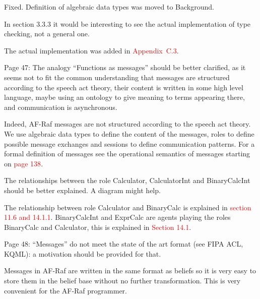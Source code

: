 \documentclass{article}
\newcommand*\R[1]{\textcolor{red}{#1}} %
\newenvironment{them}{\noindent\begingroup\color{blue}}{\endgroup\par}
\begin{document}
Fixed. Definition of algebraic data types was moved to Background.

\begin{them}

In section 3.3.3 it would be interesting to see the actual implementation of
type checking, not a general one.

\end{them}

The actual implementation was added in \R{Appendix~C.3}.

\begin{them}

Page 47:
The analogy “Functions as messages” should be better clarified, as it seems not
to fit the common understanding that messages are structured according to the
speech act theory, their content is written in some high level language, maybe
using an ontology to give meaning to terms appearing there, and communication
is asynchronous.

\end{them}
Indeed, AF-Raf messages are not structured according to  the speech act
theory.  We use algebraic data types to define the content of the messages,
roles to define possible message exchanges and sessions to define communication
patterns. For a formal definition of messages see the operational semantics of
messages starting on \R{page 138}.

\begin{them}

The relationships between the role Calculator, CalculatorInt and BinaryCalcInt
should be better explained. A diagram might help.

\end{them}
The relationship between role Calculator and BinaryCalc is explained in
\R{section 11.6 and 14.1.1}. BinaryCalcInt and ExprCalc are agents playing the
roles BinaryCalc and Calculator, this is explained in \R{Section 14.1}.

\begin{them}

Page 48:
“Messages” do not meet the state of the art format (see FIPA ACL, KQML): a
motivation should be provided for that.

\end{them}

Messages in AF-Raf are written in the same format as beliefs so it is very easy
to store them in the belief base without no further transformation. This is
very convenient for the AF-Raf programmer. 
\end{document}
